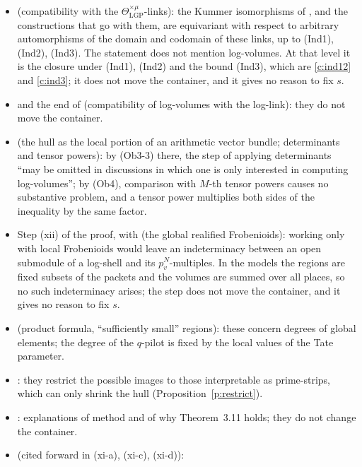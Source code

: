 \documentclass[11pt]{article}
\theoremstyle{plain}
\theoremstyle{definition}
\theoremstyle{remark}
\begin{document}
\begin{itemize}[leftmargin=2em]
\item \cite[Thm.~3.11(iii)]{IUT3} (compatibility with the
  $\Theta^{\times\mu}_{\mathrm{LGP}}$-links): the Kummer isomorphisms of
  \cite[Thm.~3.11(ii)]{IUT3}, and the constructions that go with them, are equivariant
  with respect to arbitrary automorphisms
  of the domain and codomain of these links, up to (Ind1), (Ind2), (Ind3). The statement
  does not mention log-volumes. At that level it is the closure under (Ind1), (Ind2) and the
  bound (Ind3), which are \ref{c:ind12} and \ref{c:ind3}; it does not move the container,
  and it gives no reason to fix $s$.
\item \cite[Prop.~3.9(iv)]{IUT3} and the end of \cite[Thm.~3.11(ii)]{IUT3}
  (compatibility of log-volumes with the log-link): they do not move the container.
\item \cite[Rem.~3.9.5(vii)]{IUT3} (the hull as the local portion of an arithmetic vector
  bundle; determinants and tensor powers): by (Ob3-3) there, the step of applying
  determinants ``may be omitted in discussions in which one is only interested in computing
  log-volumes''; by (Ob4), comparison with $M$-th tensor powers causes no substantive
  problem, and a tensor power multiplies both sides of the inequality by the same factor.
\item Step (xii) of the proof, with \cite[Rem.~3.6.2(i)]{IUT3} (the global realified
  Frobenioids): working only with local Frobenioids would leave an indeterminacy between an
  open submodule of a log-shell and its $p_v^N$-multiples. In the models the regions are
  fixed subsets of the packets and the volumes are summed over all places, so no such
  indeterminacy arises; the step does not move the container, and it gives no reason to
  fix $s$.
\item \cite[Rem.~3.9.6]{IUT3} (product formula, ``sufficiently small'' regions): these
  concern degrees of global elements; the degree of the $q$-pilot is fixed by the local
  values of the Tate parameter.
\item \cite[Rem.~2.4.2(iv)--(vi), Rem.~3.9.7]{IUT3}: they restrict the possible images to
  those interpretable as prime-strips, which can only shrink the hull
  (Proposition~\ref{p:restrict}).
\item \cite[Rem.~3.11.3, Rem.~3.10.1, Rem.~1.2.2, Rem.~1.5.4]{IUT3}: explanations of
  method and of why Theorem~3.11 holds; they do not change the container.
\item \cite[Rem.~3.12.2(ii), (iv), (v)]{IUT3} (cited forward in (xi-a), (xi-c), (xi-d)):

\end{itemize}
\end{document}

